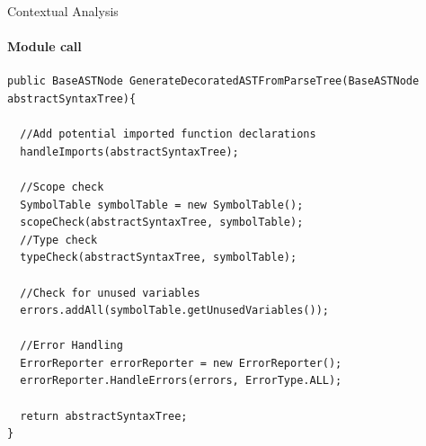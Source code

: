 \begin{frame}{Contextual Analysis}
\framesubtitle{Module call}

\begin{lstlisting}
public BaseASTNode GenerateDecoratedASTFromParseTree(BaseASTNode abstractSyntaxTree){

  //Add potential imported function declarations
  handleImports(abstractSyntaxTree);

  //Scope check
  SymbolTable symbolTable = new SymbolTable();
  scopeCheck(abstractSyntaxTree, symbolTable);
  //Type check
  typeCheck(abstractSyntaxTree, symbolTable);

  //Check for unused variables
  errors.addAll(symbolTable.getUnusedVariables());

  //Error Handling
  ErrorReporter errorReporter = new ErrorReporter();
  errorReporter.HandleErrors(errors, ErrorType.ALL);

  return abstractSyntaxTree;
}
\end{lstlisting}

\end{frame}